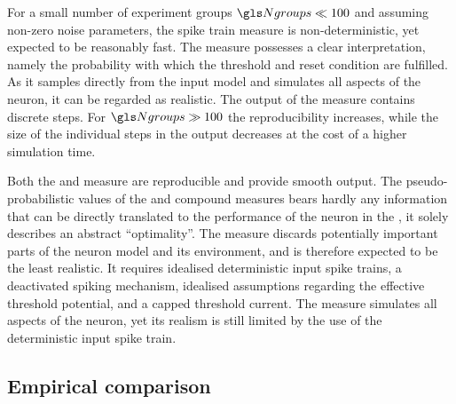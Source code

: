 For a small number of experiment groups $\Ngroups \ll 100$ and assuming non-zero noise parameters, the spike train measure is non-deterministic, yet expected to be reasonably fast. The measure possesses a clear interpretation, namely the probability with which the threshold and reset condition are fulfilled. As it samples directly from the input model and simulates all aspects of the neuron, it can be regarded as realistic. The output of the measure contains discrete steps. For $\Ngroups \gg 100$ the reproducibility increases, while the size of the individual steps in the output decreases at the cost of a higher simulation time.

Both the \SGSO and \SGMO measure are reproducible and provide smooth output. The pseudo-probabilistic values of the \PSGSO and \PSGMO compound measures bears hardly any information that can be directly translated to the performance of the neuron in the \BiNAM, it solely describes an abstract \enquote{optimality}. The \SGSO measure discards potentially important parts of the neuron model and its environment, and is therefore expected to be the least realistic. It requires idealised deterministic input spike trains, a deactivated spiking mechanism, idealised assumptions regarding the effective threshold potential, and a capped threshold current. The \SGMO measure simulates all aspects of the neuron, yet its realism is still limited by the use of the deterministic input spike train.

\subsection{Empirical comparison}
\label{sec:single_neuron_empirical}

